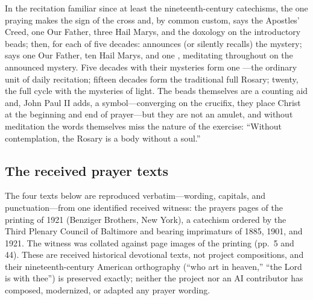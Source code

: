 In the recitation familiar since at least the nineteenth-century
catechisms, the one praying makes the sign of the cross and, by common
custom, says the Apostles' Creed, one Our Father, three Hail Marys, and
the doxology on the introductory beads; then, for each of five decades:
announces (or silently recalls) the mystery; says one Our Father, ten
Hail Marys, and one , meditating throughout
on the announced mystery. Five decades with their mysteries form one
---the ordinary unit of daily recitation; fifteen decades
form the traditional full Rosary; twenty, the full cycle with the
mysteries of light. The beads themselves are a counting aid and, John
Paul II adds, a symbol---converging on the crucifix, they place Christ
at the beginning and end of prayer---but they are not an amulet, and
without meditation the words themselves miss the nature of the
exercise: ``Without contemplation, the Rosary is a body without a
soul.''

\subsection{The received prayer texts}
\label{sec:prayertexts}

The four texts below are reproduced verbatim---wording, capitals, and
punctuation---from one identified received witness: the prayers pages of
the  printing of 1921 (Benziger
Brothers, New York), a catechism ordered by the Third Plenary Council of
Baltimore and bearing imprimaturs of 1885, 1901, and 1921. The witness
was collated against page images of the printing (pp.~5 and 44). These
are received historical devotional texts, not project compositions, and
their nineteenth-century American orthography (``who art in heaven,''
``the Lord is with thee'') is preserved exactly; neither the project nor
an AI contributor has composed, modernized, or adapted any prayer
wording.

